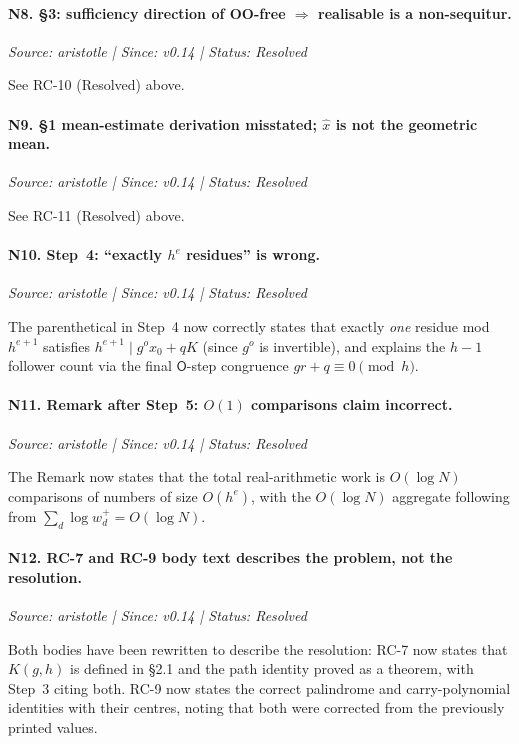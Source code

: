 \documentclass[12pt]{article}
\theoremstyle{definition}
\theoremstyle{remark}
\theoremstyle{plain}
\newcommand{\OO}{\mathsf{O}}
\begin{document}
\paragraph{N8. \S3: sufficiency direction of OO-free $\Rightarrow$ realisable is a non-sequitur.}
\textit{Source: aristotle | Since: v0.14 | Status: Resolved}

See RC-10 (Resolved) above.

\paragraph{N9. \S1 mean-estimate derivation misstated; $\hat{x}$ is not the geometric mean.}
\textit{Source: aristotle | Since: v0.14 | Status: Resolved}

See RC-11 (Resolved) above.

\paragraph{N10. Step~4: ``exactly $h^e$ residues'' is wrong.}
\textit{Source: aristotle | Since: v0.14 | Status: Resolved}

The parenthetical in Step~4 now correctly states that exactly \emph{one}
residue mod $h^{e+1}$ satisfies $h^{e+1} \mid g^o x_0 + qK$ (since $g^o$ is
invertible), and explains the $h-1$ follower count via the final $\OO$-step
congruence $gr + q \equiv 0 \pmod{h}$.

\paragraph{N11. Remark after Step~5: $O(1)$ comparisons claim incorrect.}
\textit{Source: aristotle | Since: v0.14 | Status: Resolved}

The Remark now states that the total real-arithmetic work is $O(\log N)$
comparisons of numbers of size $O(h^e)$, with the $O(\log N)$ aggregate
following from $\sum_d \log w^+_d = O(\log N)$.

\paragraph{N12. RC-7 and RC-9 body text describes the problem, not the resolution.}
\textit{Source: aristotle | Since: v0.14 | Status: Resolved}

Both bodies have been rewritten to describe the resolution:
RC-7 now states that $K(g,h)$ is defined in \S2.1 and the path identity proved
as a theorem, with Step~3 citing both.
RC-9 now states the correct palindrome and carry-polynomial identities with their
centres, noting that both were corrected from the previously printed values.
\end{document}

